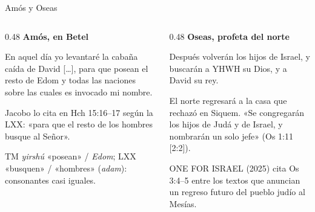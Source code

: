 \begin{frame}{Amós y Oseas}
\begin{columns}[T,onlytextwidth]
\begin{column}{0.48\textwidth}
\textbf{\textcolor{cafe}{Amós, en Betel}}
\begin{cita}[fontupper=\scriptsize\itshape]En aquel día yo levantaré la cabaña caída de David [\ldots], para que posean el resto de Edom y todas las naciones sobre las cuales es invocado mi nombre.\end{cita}
\footnotesize Jacobo lo cita en Hch 15:16--17 según la LXX: «para que el resto de los hombres busque al Señor».
\begin{notalam}[TM y LXX]
TM \emph{yirshú} «posean» / \emph{Edom}; LXX «busquen» / «hombres» (\emph{adam}): consonantes casi iguales.
\end{notalam}
\end{column}
\begin{column}{0.48\textwidth}
\textbf{\textcolor{cafe}{Oseas, profeta del norte}}
\begin{cita}[fontupper=\scriptsize\itshape]Después volverán los hijos de Israel, y buscarán a YHWH su Dios, y a David su rey.\end{cita}
\footnotesize El norte regresará a la casa que rechazó en Siquem. «Se congregarán los hijos de Judá y de Israel, y nombrarán un solo jefe» (Os 1:11 [2:2]).\par\smallskip
\begin{clave}ONE FOR ISRAEL (2025) cita Os 3:4--5 entre los textos que anuncian un regreso futuro del pueblo judío al Mesías.\end{clave}
\end{column}
\end{columns}
\end{frame}

